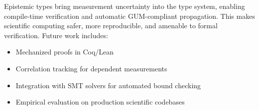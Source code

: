 \documentclass[11pt]{article}
\begin{document}
Epistemic types bring measurement uncertainty into the type system, enabling compile-time verification and automatic GUM-compliant propagation. This makes scientific computing safer, more reproducible, and amenable to formal verification. Future work includes:
\begin{itemize}
\item Mechanized proofs in Coq/Lean
\item Correlation tracking for dependent measurements
\item Integration with SMT solvers for automated bound checking
\item Empirical evaluation on production scientific codebases
\end{itemize}
\end{document}
